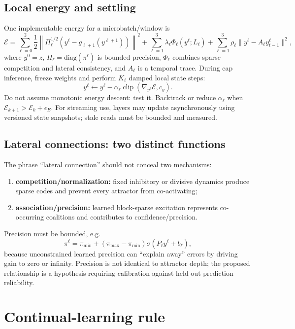 \documentclass[10pt]{article}
\begin{document}
\subsection{Local energy and settling}
One implementable energy for a microbatch/window is
\[
\mathcal E =
\sum_{\ell=0}^{2}\frac12
\left\|\Pi_\ell^{1/2}
\left(y^\ell-g_{\ell+1}(y^{\ell+1})\right)\right\|^2
+\sum_{\ell=1}^{3}\lambda_\ell\Phi_\ell(y^\ell;L_\ell)
+\sum_{\ell=1}^{3}\rho_\ell\|y^\ell-A_\ell y_{t-1}^\ell\|^2 ,
\]
where $y^0=z$, $\Pi_\ell=\mathrm{diag}(\pi^\ell)$ is bounded precision,
$\Phi_\ell$ combines sparse competition and lateral consistency, and $A_\ell$ is a
temporal trace.  During cap inference, freeze weights and perform $K_\ell$ damped local
state steps:
\[
y^\ell \leftarrow y^\ell-\alpha_\ell
\operatorname{clip}\!\left(\nabla_{y^\ell}\mathcal E,c_y\right).
\]
Do not assume monotonic energy descent: test it.  Backtrack or reduce $\alpha_\ell$ when
$\mathcal E_{k+1}>\mathcal E_k+\epsilon_E$.  For streaming use, layers may update
asynchronously using versioned state snapshots; stale reads must be bounded and measured.

\subsection{Lateral connections: two distinct functions}
The phrase ``lateral connection'' should not conceal two mechanisms:
\begin{enumerate}
  \item \textbf{competition/normalization:} fixed inhibitory or divisive dynamics produce
  sparse codes and prevent every attractor from co-activating;
  \item \textbf{association/precision:} learned block-sparse excitation represents
  co-occurring coalitions and contributes to confidence/precision.
\end{enumerate}
Precision must be bounded, e.g.
\[
\pi^\ell=\pi_{\min}+(\pi_{\max}-\pi_{\min})
\sigma(P_\ell y^\ell+b_\ell),
\]
because unconstrained learned precision can ``explain away'' errors by driving gain to zero
or infinity.  Precision is not identical to attractor depth; the proposed relationship is a
hypothesis requiring calibration against held-out prediction reliability.

\section{Continual-learning rule}
\end{document}

